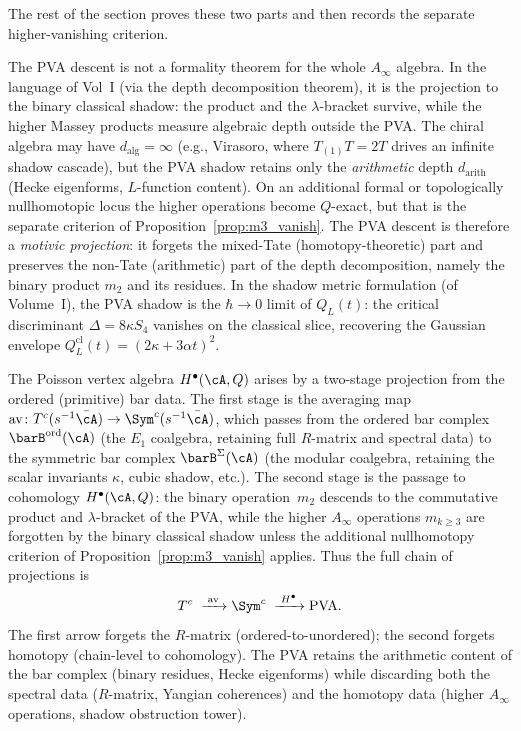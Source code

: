 The rest of the section proves these two parts and then records the
separate higher-vanishing criterion.

\begin{remark}
\label{rem:pva-depth-decomposition}
The PVA descent is not a formality theorem for the whole
$A_\infty$ algebra. In the language of Vol~I
(via the depth decomposition theorem), it is the projection to the
binary classical shadow: the product and the $\lambda$-bracket
survive, while the higher Massey products measure algebraic depth
outside the PVA. The chiral algebra may have
$d_{\mathrm{alg}} = \infty$ (e.g., Virasoro, where
$T_{(1)}T = 2T$ drives an infinite shadow cascade), but the PVA
shadow retains only the \emph{arithmetic} depth
$d_{\mathrm{arith}}$ (Hecke eigenforms, $L$-function content).
On an additional formal or topologically nullhomotopic locus the
higher operations become $Q$-exact, but that is the separate
criterion of Proposition~\ref{prop:m3_vanish}. The PVA descent is
therefore a \emph{motivic projection}: it forgets the mixed-Tate
(homotopy-theoretic) part and preserves
the non-Tate (arithmetic) part of the depth decomposition, namely
the binary product $m_2$ and its residues.
In the shadow metric formulation
(of Volume~I),
the PVA shadow is the
$\hbar \to 0$ limit of $Q_L(t)$: the critical discriminant
$\Delta = 8\kappa S_4$ vanishes on the classical slice,
recovering the Gaussian envelope
$Q_L^{\mathrm{cl}}(t) = (2\kappa + 3\alpha t)^2$.
\end{remark}

\begin{remark}
\label{rem:pva-two-stage-projection}
The Poisson vertex algebra $H^\bullet(\cA, Q)$ arises by a
two-stage projection from the ordered (primitive) bar data. The
first stage is the averaging map
$\mathrm{av}\colon T^c(s^{-1}\bar\cA) \to \Sym^c(s^{-1}\bar\cA)$,
which passes from the ordered bar complex $\barB^{\mathrm{ord}}(\cA)$
(the $E_1$ coalgebra, retaining full $R$-matrix and spectral data)
to the symmetric bar complex $\barB^{\Sigma}(\cA)$ (the modular
coalgebra, retaining the scalar invariants $\kappa$, cubic shadow, etc.).
The second stage is the passage to cohomology
$H^\bullet(\cA, Q)$: the binary operation~$m_2$ descends to the
commutative product and $\lambda$-bracket of the PVA, while the
higher $A_\infty$ operations $m_{k \ge 3}$ are forgotten by the
binary classical shadow unless the additional nullhomotopy criterion
of Proposition~\ref{prop:m3_vanish} applies.
Thus the full chain of projections is
\[
 T^c \;\xrightarrow{\;\mathrm{av}\;}
 \Sym^c \;\xrightarrow{\;H^\bullet\;}
 \mathrm{PVA}.
\]
The first arrow forgets the $R$-matrix (ordered-to-unordered); the
second forgets homotopy (chain-level to cohomology). The
PVA retains the arithmetic content of the bar complex
(binary residues, Hecke eigenforms) while discarding both
the spectral data ($R$-matrix, Yangian coherences) and the
homotopy data (higher $A_\infty$ operations, shadow obstruction
tower).
\end{remark}

